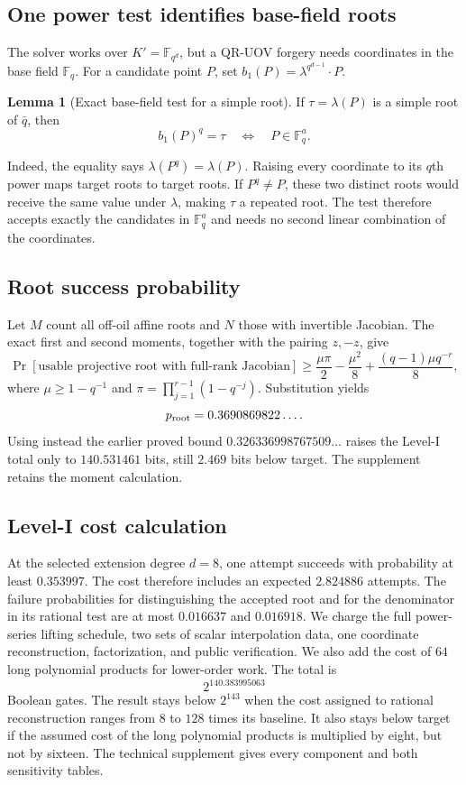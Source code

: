\documentclass[11pt,a4paper]{article}
\theoremstyle{definition}
\newtheorem{lemma}[theorem]{Lemma}
\theoremstyle{remark}
\newcommand{\F}{\mathbb F}
\begin{document}
\subsection{One power test identifies base-field roots}\label{sec:frob}

The solver works over $K'=\F_{q^d}$, but a QR-UOV forgery needs coordinates
in the base field $\F_q$.  For a candidate point $P$, set
$b_1(P)=\lambda^{q^{d-1}}\cdot P$.

\begin{lemma}[Exact base-field test for a simple root]\label{lem:exactfrob}
If $\tau=\lambda(P)$ is a simple root of $\bar q$, then
\[
 b_1(P)^q=\tau\quad\Longleftrightarrow\quad P\in\F_q^a.
\]
\end{lemma}

Indeed, the equality says $\lambda(P^q)=\lambda(P)$.  Raising every coordinate
to its $q$th power maps target roots to target roots.  If $P^q\ne P$, these two
distinct roots would receive the same value under $\lambda$, making $\tau$ a
repeated root.  The test therefore accepts exactly the candidates in
$\F_q^a$ and needs no second linear combination of the coordinates.

\subsection{Root success probability}\label{sec:rootbound}

Let $M$ count all off-oil affine roots and $N$ those with invertible Jacobian.
The exact first and second moments, together with the pairing $z,-z$, give
\[
 \Pr[\text{usable projective root with full-rank Jacobian}]
 \ge \frac{\mu\pi}{2}-\frac{\mu^2}{8}
   +\frac{(q-1)\mu q^{-r}}8,
\]
where $\mu\ge1-q^{-1}$ and
$\pi=\prod_{j=1}^{r-1}(1-q^{-j})$.  Substitution yields
\[
 p_{\rm root}=0.3690869822\ldots.
\]
Using instead the earlier proved bound
$0.326336998767509\ldots$ raises the Level-I total only to $140.531461$ bits,
still $2.469$ bits below target.  The supplement retains the moment
calculation.

\subsection{Level-I cost calculation}

At the selected extension degree $d=8$, one attempt succeeds with probability
at least $0.353997$.  The cost therefore includes an expected $2.824886$
attempts.  The failure probabilities for distinguishing the accepted root and
for the denominator in its rational test are at most $0.016637$ and
$0.016918$.  We charge the full power-series lifting schedule, two sets of
scalar interpolation data, one coordinate reconstruction, factorization, and
public verification.  We also add the cost of $64$ long polynomial products
for lower-order work.  The total is
\[
 2^{140.383995063}
\]
Boolean gates.  The result stays below $2^{143}$ when the
cost assigned to rational reconstruction ranges from $8$ to $128$ times its
baseline.  It also stays below target if the assumed cost of the long
polynomial products is multiplied by eight, but not by sixteen.  The technical
supplement gives every component and both sensitivity tables.
\end{document}
